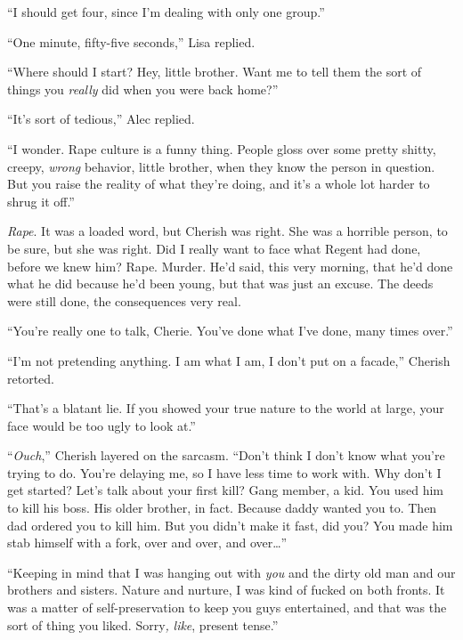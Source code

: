 ``I should get four, since I'm dealing with only one group.''



``One minute, fifty-five seconds,'' Lisa replied.



``Where should I start?  Hey, little brother.  Want me to tell them the sort of things you \emph{really} did when you were back home?''



``It's sort of tedious,'' Alec replied.



``I wonder.  Rape culture is a funny thing.  People gloss over some pretty shitty, creepy, \emph{wrong} behavior, little brother, when they know the person in question.  But you raise the reality of what they're doing, and it's a whole lot harder to shrug it off.''



\emph{Rape}.  It was a loaded word, but Cherish was right.  She was a horrible person, to be sure, but she was right.  Did I really want to face what Regent had done, before we knew him?  Rape.  Murder.  He'd said, this very morning, that he'd done what he did because he'd been young, but that was just an excuse.  The deeds were still done, the consequences very real.



``You're really one to talk, Cherie.  You've done what I've done, many times over.''



``I'm not pretending anything.  I am what I am, I don't put on a facade,'' Cherish retorted.



``That's a blatant lie.  If you showed your true nature to the world at large, your face would be too ugly to look at.''



``\emph{Ouch},'' Cherish layered on the sarcasm.  ``Don't think I don't know what you're trying to do.  You're delaying me, so I have less time to work with.  Why don't I get started?  Let's talk about your first kill?  Gang member, a kid.  You used him to kill his boss.  His older brother, in fact.  Because daddy wanted you to.  Then dad ordered you to kill him.  But you didn't make it fast, did you?  You made him stab himself with a fork, over and over, and over\ldots''



``Keeping in mind that I was hanging out with \emph{you} and the dirty old man and our brothers and sisters.  Nature and nurture, I was kind of fucked on both fronts.  It was a matter of self-preservation to keep you guys entertained, and that was the sort of thing you liked.  Sorry\emph{, }\emph{like}, present tense.''



